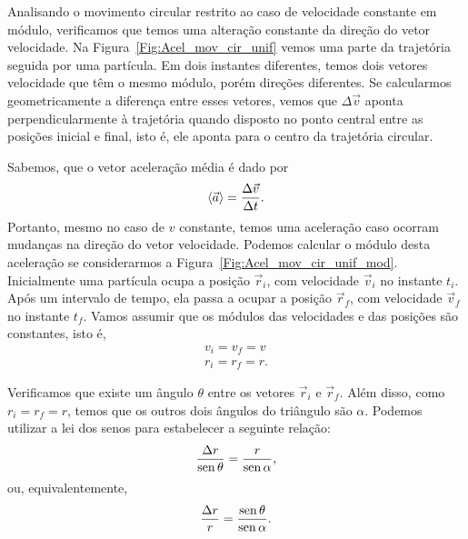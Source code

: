 Analisando o movimento circular restrito ao caso de velocidade constante em módulo, verificamos que temos uma alteração constante da direção do vetor velocidade. Na Figura~\ref{Fig:Acel_mov_cir_unif} vemos uma parte da trajetória seguida por uma partícula. Em dois instantes diferentes, temos dois vetores velocidade que têm o mesmo módulo, porém direções diferentes. Se calcularmos geometricamente a diferença entre esses vetores, vemos que $\Delta \vec{v}$ aponta perpendicularmente à trajetória quando disposto no ponto central entre as posições inicial e final, isto é, ele aponta para o centro da trajetória circular.

Sabemos, que o vetor aceleração média é dado por
\begin{equation}
  \left\langle{\vec{a}}\right\rangle = \frac{\Delta \vec{v}}{\Delta t}.
\end{equation}
%
Portanto, mesmo no caso de $v$ constante, temos uma aceleração caso ocorram mudanças na direção do vetor velocidade. Podemos calcular o módulo desta aceleração se considerarmos a Figura~\ref{Fig:Acel_mov_cir_unif_mod}. Inicialmente uma partícula ocupa a posição $\vec{r}_i$, com velocidade $\vec{v}_i$ no instante $t_i$. Após um intervalo de tempo, ela passa a ocupar a posição $\vec{r}_f$, com velocidade $\vec{v}_f$ no instante $t_f$. Vamos assumir que os módulos das velocidades e das posições são constantes, isto é,
\begin{align}
    v_i = v_f = v \\
    r_i = r_f = r.
\end{align} 

Verificamos que existe um ângulo $\theta$ entre os vetores $\vec{r}_i$ e $\vec{r}_f$. Além disso, como $r_i = r_f = r$, temos que os outros dois ângulos do triângulo são $\alpha$. Podemos utilizar a lei dos senos para estabelecer a seguinte relação:
\begin{equation}
    \frac{\Delta r}{\operatorname{sen} \theta} = \frac{r}{\operatorname{sen} \alpha},
\end{equation}
%
ou, equivalentemente,
\begin{equation}
    \frac{\Delta r}{r} = \frac{\operatorname{sen} \theta}{\operatorname{sen} \alpha}.
\end{equation}

